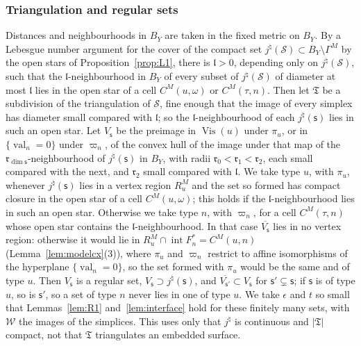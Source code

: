 \subsubsection*{Triangulation and regular sets}
Distances and neighbourhoods in $B_Y$ are taken in the fixed metric on $B_Y$. By a Lebesgue number argument for the
cover of the compact set $j^\natural(\mathscr S)\subset B_Y\setminus\Gamma^M$ by the open stars of
Proposition~\ref{prop:L1}, there is $\mathfrak l>0$, depending only on $j^\natural(\mathscr S)$, such that the
$\mathfrak l$-neighbourhood in $B_Y$ of every subset of $j^\natural(\mathscr S)$ of diameter at most $\mathfrak l$ lies in the
open star of a cell $C^M(u,\omega)$ or $C^M(\tau,n)$. Then let $\mathfrak T$ be a subdivision of the triangulation of
$\mathscr S$, fine enough that the image of every simplex has diameter small compared with $\mathfrak l$; so the
$\mathfrak l$-neighbourhood of each $j^\natural(\mathsf s)$ lies in such an open star. Let $V_{\mathsf s}$ be the preimage in
$\operatorname{Vis}(u)$ under $\pi_u$, or in $\{\operatorname{val}_n=0\}$ under $\varpi_n$, of the convex hull of the image under that map of the $\mathfrak r_{\dim \mathsf s}$-neighbourhood of
$j^\natural(\mathsf s)$ in $B_Y$, with radii $\mathfrak r_0<\mathfrak r_1<\mathfrak r_2$, each small compared with the next, and
$\mathfrak r_2$ small compared with $\mathfrak l$. We take type $u$, with $\pi_u$, whenever $j^\natural(\mathsf s)$ lies in a vertex region $R^M_u$ and the set so
formed has compact closure in the open star of a cell $C^M(u,\omega)$; this holds if the $\mathfrak l$-neighbourhood lies in
such an open star. Otherwise we take type $n$, with $\varpi_n$, for a cell $C^M(\tau,n)$ whose open star contains the
$\mathfrak l$-neighbourhood. In that case $\overline{V_{\mathsf s}}$ lies in no vertex region: otherwise it would lie in
$R^M_u\cap\operatorname{int}F^*_n=C^M(u,n)$ (Lemma~\ref{lem:modelcx}(3)), where $\pi_u$ and $\varpi_n$ restrict to affine
isomorphisms of the hyperplane $\{\operatorname{val}_n=0\}$, so the set formed with $\pi_u$ would be the same and of type
$u$. Then $V_{\mathsf s}$ is a regular set, $V_{\mathsf s}\supset j^\natural(\mathsf s)$, and $\overline{V_{\mathsf s'}}\subset V_{\mathsf s}$ for
$\mathsf s'\subsetneq \mathsf s$; if $\mathsf s$ is of type $u$, so is $\mathsf s'$, so a set of type $n$ never lies in one of type $u$.
We take $\epsilon$ and $t$ so small that
Lemmas~\ref{lem:R1} and~\ref{lem:interface} hold for these finitely many sets, with $\mathcal W$ the images of the
simplices. This uses only that $j^\natural$ is continuous and $|\mathfrak T|$ compact, not that $\mathfrak T$ triangulates an
embedded surface.

